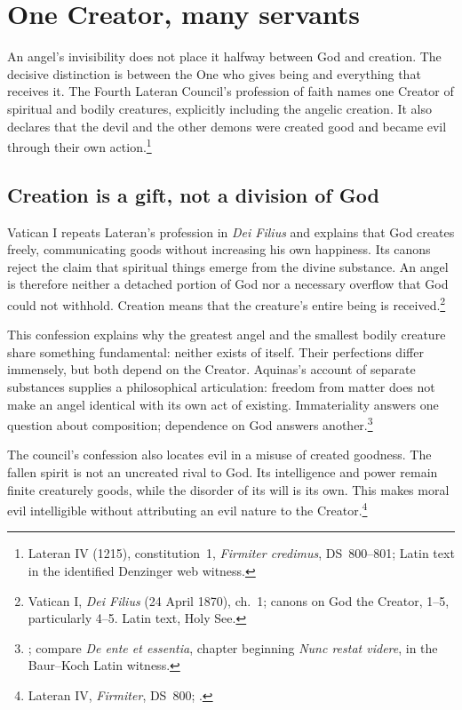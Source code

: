 \section{One Creator, many servants}
\label{sec:faith}

An angel's invisibility does not place it halfway between God and creation.
The decisive distinction is between the One who gives being and everything
that receives it. The Fourth Lateran Council's profession of faith names
one Creator of spiritual and bodily creatures, explicitly including the
angelic creation. It also declares that the devil and the other demons
were created good and became evil through their own action.\footnote{Lateran IV
(1215), constitution~1, \emph{Firmiter credimus}, DS~800--801;
Latin text in the identified Denzinger web witness.}

\subsection{Creation is a gift, not a division of God}

Vatican I repeats Lateran's profession in \emph{Dei Filius} and explains
that God creates freely, communicating goods without increasing his own
happiness. Its canons reject the claim that spiritual things emerge from
the divine substance. An angel is therefore neither a detached portion of
God nor a necessary overflow that God could not withhold. Creation means
that the creature's entire being is received.\footnote{Vatican I,
\emph{Dei Filius} (24 April 1870), ch.~1; canons on God the Creator,
1--5, particularly 4--5. Latin text, Holy See.}

This confession explains why the greatest angel and the smallest bodily
creature share something fundamental: neither exists of itself. Their
perfections differ immensely, but both depend on the Creator. Aquinas's
account of separate substances supplies a philosophical articulation:
freedom from matter does not make an angel identical with its own act of
existing. Immateriality answers one question about composition; dependence
on God answers another.\footnote{; compare
\emph{De ente et essentia}, chapter beginning \emph{Nunc restat videre}, in the Baur--Koch Latin witness.}

The council's confession also locates evil in a misuse of created goodness.
The fallen spirit is not an uncreated rival to God. Its intelligence and
power remain finite creaturely goods, while the disorder of its will is
its own. This makes moral evil intelligible without attributing an evil
nature to the Creator.\footnote{Lateran IV, \emph{Firmiter}, DS~800;
.}

